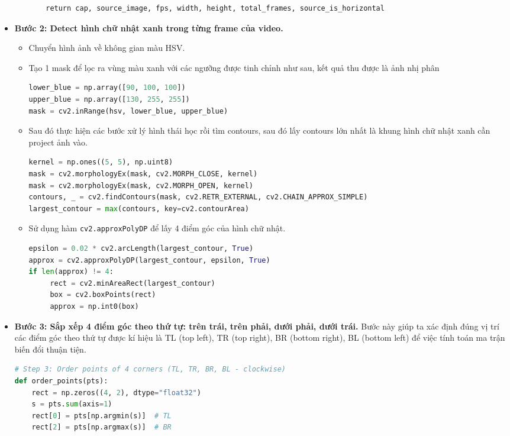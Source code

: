 \begin{itemize}
\begin{itemize}[label={--}]
\begin{lstlisting}
    return cap, source_image, fps, width, height, total_frames, source_is_horizontal
                    \end{lstlisting}
               \end{itemize}
               \item \textbf{Bước 2: Detect hình chữ nhật xanh trong từng frame của video.}
               \begin{itemize}[label={--}]
                    \item Chuyển hình ảnh về không gian màu HSV.
                    \item Tạo 1 mask để lọc ra vùng màu xanh với các ngưỡng được tinh chỉnh như sau, kết quả thu được là ảnh nhị phân
                    \begin{lstlisting}[language=Python]
lower_blue = np.array([90, 100, 100])
upper_blue = np.array([130, 255, 255])
mask = cv2.inRange(hsv, lower_blue, upper_blue)
                    \end{lstlisting}
                    \item Sau đó thực hiện các bước xử lý hình thái học rồi tìm contours, sau đó lấy contours lớn nhất là khung hình chữ nhật xanh cần project ảnh vào.
                    \begin{lstlisting}[language=Python]
kernel = np.ones((5, 5), np.uint8)
mask = cv2.morphologyEx(mask, cv2.MORPH_CLOSE, kernel)
mask = cv2.morphologyEx(mask, cv2.MORPH_OPEN, kernel)
contours, _ = cv2.findContours(mask, cv2.RETR_EXTERNAL, cv2.CHAIN_APPROX_SIMPLE)
largest_contour = max(contours, key=cv2.contourArea)
                    \end{lstlisting}
                    \item Sử dụng hàm \texttt{cv2.approxPolyDP} để lấy 4 điểm góc của hình chữ nhật.
                    \begin{lstlisting}[language=Python]
epsilon = 0.02 * cv2.arcLength(largest_contour, True)
approx = cv2.approxPolyDP(largest_contour, epsilon, True)
if len(approx) != 4:
     rect = cv2.minAreaRect(largest_contour)
     box = cv2.boxPoints(rect)
     approx = np.int0(box)
                    \end{lstlisting}     
               \end{itemize}
               \item \textbf{Bước 3: Sắp xếp 4 điểm góc theo thứ tự: trên trái, trên phải, dưới phải, dưới trái.}
               \newline
               \hspace*{0.6cm}Bước này giúp ta xác định đúng vị trí các điểm góc theo thứ tự được kí hiệu là TL (top left), TR (top right), BR (bottom right), BL (bottom left) để việc tính toán ma trận biến đổi thuận tiện.
               \begin{lstlisting}[language=Python]
# Step 3: Order points of 4 corners (TL, TR, BR, BL - clockwise)
def order_points(pts):
    rect = np.zeros((4, 2), dtype="float32")
    s = pts.sum(axis=1)
    rect[0] = pts[np.argmin(s)]  # TL
    rect[2] = pts[np.argmax(s)]  # BR


\end{lstlisting}
\end{itemize}
